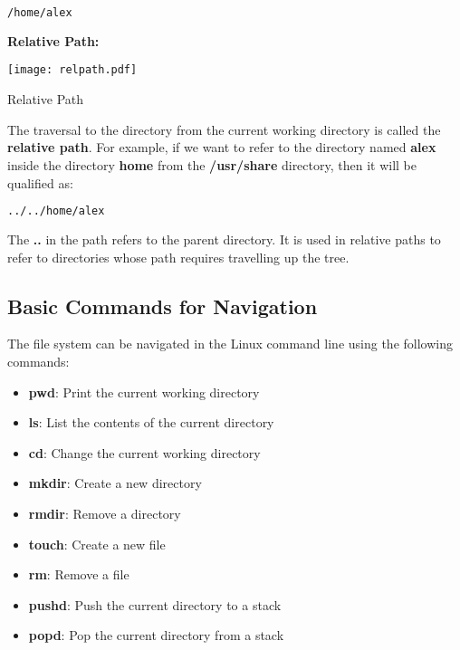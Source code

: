 \begin{lstlisting}[language=bash]
  /home/alex
\end{lstlisting}

\textbf{Relative Path:}

\begin{marginfigure}
	\texttt{[image: relpath.pdf]}
	\caption[Relative Path]{Relative Path}
\end{marginfigure}

The traversal to the directory from the current working directory is called the \textbf{relative path}. For example, if we want to refer to the directory named \textbf{alex} inside the directory \textbf{home} from the \textbf{/usr/share} directory, then it will be qualified as:

\begin{lstlisting}[language=bash]
  ../../home/alex
\end{lstlisting}

\begin{remark}
  The \textbf{..} in the path refers to the parent directory. It is used in relative paths to refer to directories whose path requires travelling up the tree.
\end{remark}

\subsection{Basic Commands for Navigation}
The file system can be navigated in the Linux command line using the following commands:
\begin{itemize}
  \item \textbf{pwd}: Print the current working directory
  \item \textbf{ls}: List the contents of the current directory
  \item \textbf{cd}: Change the current working directory
  \item \textbf{mkdir}: Create a new directory
  \item \textbf{rmdir}: Remove a directory
  \item \textbf{touch}: Create a new file
  \item \textbf{rm}: Remove a file
  \item \textbf{pushd}: Push the current directory to a stack
  \item \textbf{popd}: Pop the current directory from a stack
\end{itemize}

